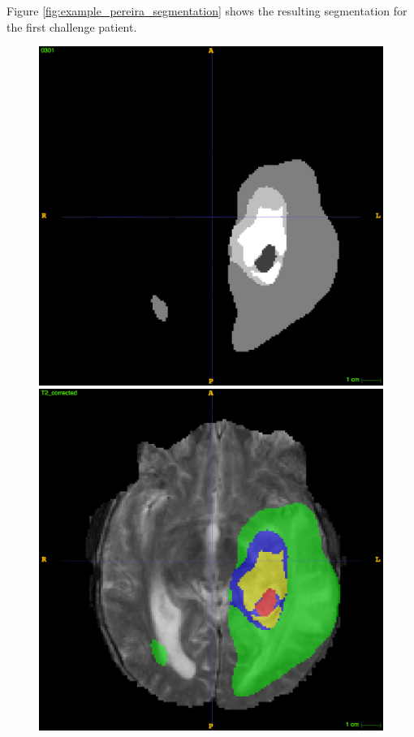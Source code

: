 \documentclass[12pt,a4paper,twoside,openright]{report}
\begin{document}
Figure \ref{fig:example_pereira_segmentation} shows the resulting segmentation for the first challenge patient.

\begin{figure}
	\centering
	\includegraphics[scale = 0.1]{challenge_1_segmentation_66}
	\includegraphics[scale = 0.1]{challenge_1_segmentation_with_T2_66}

\end{figure}
\end{document}
